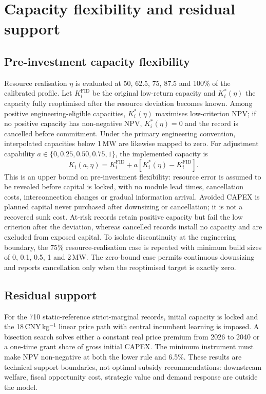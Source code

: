 \documentclass[11pt,a4paper]{article}
\begin{document}
\section{Capacity flexibility and residual support}\label{sec:policy}

\subsection{Pre-investment capacity flexibility}

Resource realisation $\eta$ is evaluated at 50, 62.5, 75, 87.5 and 100\% of the calibrated profile. Let $K_i^{\mathrm{FID}}$ be the original low-return capacity and $K_i^*(\eta)$ the capacity fully reoptimised after the resource deviation becomes known. Among positive engineering-eligible capacities, $K_i^*(\eta)$ maximises low-criterion NPV; if no positive capacity has non-negative NPV, $K_i^*(\eta)=0$ and the record is cancelled before commitment. Under the primary engineering convention, interpolated capacities below 1\,MW are likewise mapped to zero. For adjustment capability $a\in\{0,0.25,0.50,0.75,1\}$, the implemented capacity is
\begin{equation}
K_i(a,\eta)=K_i^{\mathrm{FID}}+a\left[K_i^*(\eta)-K_i^{\mathrm{FID}}\right].
\label{eq:flexibility}
\end{equation}
This is an upper bound on pre-investment flexibility: resource error is assumed to be revealed before capital is locked, with no module lead times, cancellation costs, interconnection changes or gradual information arrival. Avoided CAPEX is planned capital never purchased after downsizing or cancellation; it is not a recovered sunk cost. At-risk records retain positive capacity but fail the low criterion after the deviation, whereas cancelled records install no capacity and are excluded from exposed capital. To isolate discontinuity at the engineering boundary, the 75\% resource-realisation case is repeated with minimum build sizes of 0, 0.1, 0.5, 1 and 2\,MW. The zero-bound case permits continuous downsizing and reports cancellation only when the reoptimised target is exactly zero.

\subsection{Residual support}

For the 710 static-reference strict-marginal records, initial capacity is locked and the 18\,CNY\,kg$^{-1}$ linear price path with central incumbent learning is imposed. A bisection search solves either a constant real price premium from 2026 to 2040 or a one-time grant share of gross initial CAPEX. The minimum instrument must make NPV non-negative at both the lower rule and 6.5\%. These results are technical support boundaries, not optimal subsidy recommendations: downstream welfare, fiscal opportunity cost, strategic value and demand response are outside the model.
\end{document}
